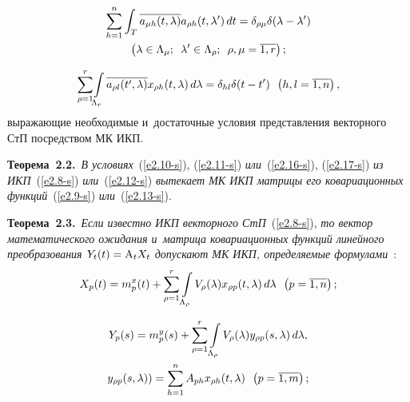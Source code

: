 \begin{multicols}{2}
\vspace*{-12pt}

\noindent
\begin{multline}
\sum\limits_{h=1}^n \int_T \overline{a_{\mu h} (t,\lambda)}a_{\rho h} 
(t,\lambda')\,dt=\delta_{\rho \mu} \delta (\lambda-\lambda')\\
 \left(\lambda\in \Lambda_\mu; 
\enskip \lambda'\in \Lambda_\rho;\enskip \rho,\mu=\overline{1,r}\right);
\label{e2.17-s}
\end{multline}

\noindent
\begin{equation*}
\sum\limits_{\rho=1}^r \!\int\limits_{\Lambda_r} \overline{a_{\rho l} (t',\lambda)}x_{\rho h} 
(t,\lambda)\,d\lambda=\delta_{hl} \delta (t-t')\enskip \left(h,l=\overline{1,n}\right),
\end{equation*}
выражающие необходимые и~достаточные условия представления векторного СтП 
посредством МК ИКП.

\smallskip

\noindent
\textbf{Теорема~2.2.}\ \textit{В условиях}~(\ref{e2.10-s}), (\ref{e2.11-s}) \textit{или}~(\ref{e2.16-s}), (\ref{e2.17-s}) 
\textit{из ИКП}~(\ref{e2.8-s}) \textit{или}~(\ref{e2.12-s}) \textit{вытекает МК 
ИКП матрицы его ковариационных функций}~(\ref{e2.9-s}) \textit{или}~(\ref{e2.13-s}).


\smallskip

\noindent
\textbf{Теорема~2.3.}\ \textit{Если известно ИКП векторного СтП}~(\ref{e2.8-s}), \textit{то вектор математического ожидания 
и~матрица ковариационных функций линейного преобразования $Y_t (t) \hm= \mathrm{A}_t 
X_t$ допускают МК ИКП, определяемые формулами}~\cite{12-s}:
\begin{equation*}
X_p(t) = m_p^x(t) + \sum\limits_{\rho=1}^r \int\limits_{\Lambda_\rho} V_\rho (\lambda) 
x_{\rho p}(t,\lambda) \,d\lambda\enskip \left(p=\overline{1,n}\right);
\end{equation*}

\vspace*{-12pt}

\noindent
\begin{multline*}
Y_p(s) = m_p^y(s) + \sum\limits_{\rho=1}^r \int\limits_{\Lambda_\rho} V_\rho (\lambda) 
y_{\rho p}(s,\lambda) \,d\lambda, 
\\
y_{\rho p}(s,\lambda)) = \sum\limits_{h=1}^n  A_{ph} x_{\rho h} (t,\lambda)\enskip 
\left(p=\overline{1,m}\right);
\end{multline*}

\vspace*{-12pt}


\end{multicols}
